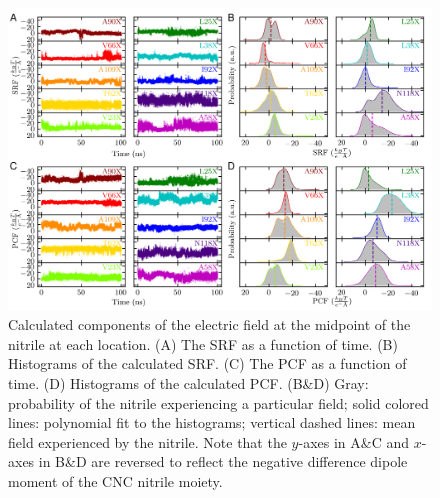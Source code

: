 \begin{figure}
    \center
    \includegraphics[width=\double]{figures-snase/combined_figure_fields.png}
    \caption[Calculated components of the electric field at the midpoint of the nitrile at each location]{
        Calculated components of the electric field at the midpoint of the nitrile at each location. 
        (A) The SRF as a function of time. 
        (B) Histograms of the calculated SRF. 
        (C) The PCF as a function of time. 
        (D) Histograms of the calculated PCF. 
        (B\&D) Gray: probability of the nitrile experiencing a particular field; 
        solid colored lines: polynomial fit to the histograms; 
        vertical dashed lines: mean field experienced by the nitrile. 
        Note that the $y$-axes in A\&C and $x$-axes in B\&D are reversed to reflect the negative difference dipole moment of the CNC nitrile moiety.
    }
    \label{fig:snase-md_field}
\end{figure}

